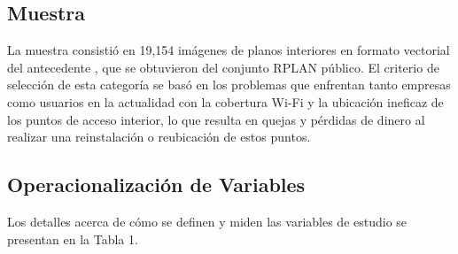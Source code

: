 \subsection{Muestra}
La muestra consistió en 19,154 imágenes de planos interiores en formato vectorial del antecedente \cite{art_wu2019interior}, que se obtuvieron del conjunto RPLAN público. El criterio de selección de esta categoría se basó en los problemas que enfrentan tanto empresas como usuarios en la actualidad con la cobertura Wi-Fi y la ubicación ineficaz de los puntos de acceso interior, lo que resulta en quejas y pérdidas de dinero al realizar una reinstalación o reubicación de estos puntos.

\subsection{Operacionalización de Variables}
Los detalles acerca de cómo se definen y miden las variables de estudio se presentan en la Tabla 1.

